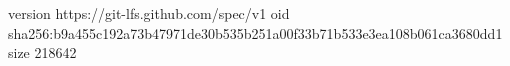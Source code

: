 version https://git-lfs.github.com/spec/v1
oid sha256:b9a455c192a73b47971de30b535b251a00f33b71b533e3ea108b061ca3680dd1
size 218642
